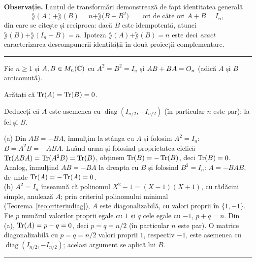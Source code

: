 \medskip
\noindent\textbf{Observație.} Lanțul de transformări demonstrează de fapt identitatea generală
\[
\rang(A) + \rang(B) = n + \rang\bigl(B - B^2\bigr)
\qquad \text{ori de câte ori } A + B = I_n,
\]
din care se citește și reciproca: dacă $B$ este idempotentă, atunci $\rang(B) + \rang(I_n - B) = n$. Ipoteza $\rang(A) + \rang(B) = n$ este deci \emph{exact} caracterizarea descompunerii identității în două proiecții complementare.
\vspace{1mm}\hrule

Fie $n\ge1$ și $A,B\in M_n(\mathbb{C})$ cu $A^2=B^2=I_n$ și $AB+BA=O_n$ (adică $A$ și $B$ anticomută).
\begin{parti}
  \item Arătați că $\operatorname{Tr}(A)=\operatorname{Tr}(B)=0$.
  \item Deduceți că $A$ este asemenea cu $\operatorname{diag}(I_{n/2},-I_{n/2})$ (în particular $n$ este par); la fel și $B$.
\end{parti}
\sol (a) Din $AB=-BA$, înmulțim la stânga cu $A$ și folosim $A^2=I_n$: $B=A^2B=-ABA$. Luând urma și folosind proprietatea ciclică $\operatorname{Tr}(ABA)=\operatorname{Tr}(A^2B)=\operatorname{Tr}(B)$, obținem $\operatorname{Tr}(B)=-\operatorname{Tr}(B)$, deci $\operatorname{Tr}(B)=0$. Analog, înmulțind $AB=-BA$ la dreapta cu $B$ și folosind $B^2=I_n$: $A=-BAB$, de unde $\operatorname{Tr}(A)=-\operatorname{Tr}(A)=0$.\\[2pt]
(b) $A^2=I_n$ înseamnă că polinomul $X^2-1=(X-1)(X+1)$, cu rădăcini simple, anulează $A$; prin criteriul polinomului minimal (Teorema~\ref{teo:criteriudiag}), $A$ este diagonalizabilă, cu valori proprii în $\{1,-1\}$. Fie $p$ numărul valorilor proprii egale cu $1$ și $q$ cele egale cu $-1$, $p+q=n$. Din (a), $\operatorname{Tr}(A)=p-q=0$, deci $p=q=n/2$ (în particular $n$ este par). O matrice diagonalizabilă cu $p=q=n/2$ valori proprii $1$, respectiv $-1$, este asemenea cu $\operatorname{diag}(I_{n/2},-I_{n/2})$; același argument se aplică lui $B$.
\vspace{1mm}\hrule

